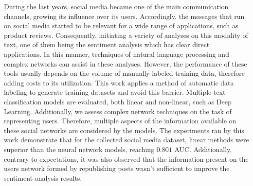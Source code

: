 \begin{foreignabstract}

During the last years, social media became one of the main communication channels, growing its influence over its users.
Accordingly, the messages that run on social media started to be relevant for a wide range of applications, such as product reviews.
Consequently, initiating a variety of analyses on this modality of text, one of them being the sentiment analysis which has clear direct applications.
In this manner, techniques of natural language processing and complex networks can assist in these analyses.
However, the performance of these tools usually depends on the volume of manually labeled training data, therefore adding costs to its utilization.
This work applies a method of automatic data labeling to generate training datasets and avoid this barrier.
Multiple text classification models are evaluated, both linear and non-linear, such as Deep Learning.
Additionally, we assess complex network techniques on the task of representing users.
Therefore, multiple aspects of the information available on these social networks are considered by the models.
The experiments ran by this work demonstrate that for the collected social media dataset,
linear methods were superior than the neural network models, reaching $0.801$ AUC.
Additionally, contrary to expectations, it was also observed that the information present on the users network formed by republishing posts wasn't sufficient to improve the sentiment analysis results.

\end{foreignabstract}

